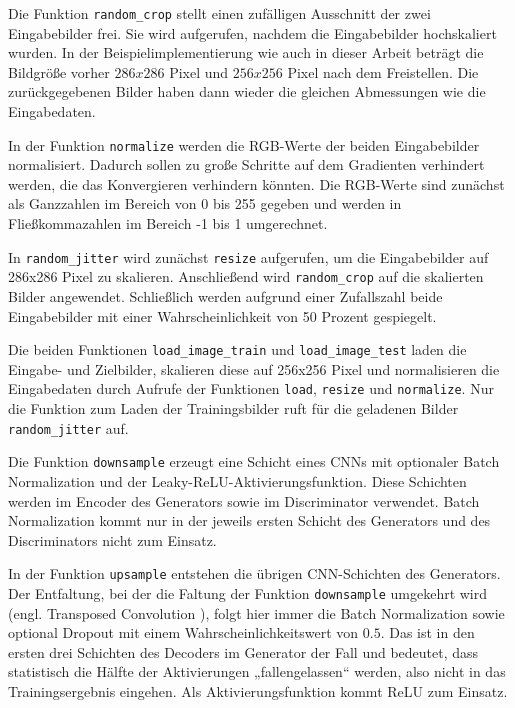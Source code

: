 Die Funktion \lstinline|random_crop| stellt einen zufälligen Ausschnitt der zwei Eingabebilder frei. Sie wird aufgerufen, nachdem die Eingabebilder hochskaliert wurden. In der Beispielimplementierung wie auch in dieser Arbeit beträgt die Bildgröße vorher $286x286$ Pixel und $256x256$ Pixel nach dem Freistellen. Die zurückgegebenen Bilder haben dann wieder die gleichen Abmessungen wie die Eingabedaten.

In der Funktion \lstinline|normalize| werden die RGB-Werte der beiden Eingabebilder normalisiert. Dadurch sollen zu große Schritte auf dem Gradienten verhindert werden, die das Konvergieren verhindern könnten. \cite{chollet2021deep} Die RGB-Werte sind zunächst als Ganzzahlen im Bereich von 0 bis 255 gegeben und werden in Fließkommazahlen im Bereich -1 bis 1 umgerechnet.

In \lstinline|random_jitter| wird zunächst \lstinline|resize| aufgerufen, um die Eingabebilder auf 286x286 Pixel zu skalieren. Anschließend wird \lstinline|random_crop| auf die skalierten Bilder angewendet. Schließlich werden aufgrund einer Zufallszahl beide Eingabebilder mit einer Wahrscheinlichkeit von 50 Prozent gespiegelt.

Die beiden Funktionen \lstinline|load_image_train| und \lstinline|load_image_test| laden die Eingabe- und Zielbilder, skalieren diese auf 256x256 Pixel und normalisieren die Eingabedaten durch Aufrufe der Funktionen \lstinline|load|, \lstinline|resize| und \lstinline|normalize|. Nur die Funktion zum Laden der Trainingsbilder ruft für die geladenen Bilder \lstinline|random_jitter| auf.

Die Funktion \lstinline|downsample| erzeugt eine Schicht eines CNNs mit optionaler Batch Normalization und der Leaky-ReLU-Aktivierungsfunktion. Diese Schichten werden im Encoder des Generators sowie im Discriminator verwendet. Batch Normalization kommt nur in der jeweils ersten Schicht des Generators und des Discriminators nicht zum Einsatz.

In der Funktion \lstinline|upsample| entstehen die übrigen CNN-Schichten des Generators. Der Entfaltung, bei der die Faltung der Funktion \lstinline|downsample| umgekehrt wird (engl. Transposed Convolution \cite{zaccone2018tensorflow}), folgt hier immer die Batch Normalization sowie optional Dropout mit einem Wahrscheinlichkeitswert von $0.5$. Das ist in den ersten drei Schichten des Decoders im Generator der Fall und bedeutet, dass statistisch die Hälfte der Aktivierungen „fallengelassen“ werden, also nicht in das Trainingsergebnis eingehen. Als Aktivierungsfunktion kommt ReLU zum Einsatz.

